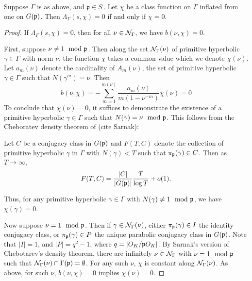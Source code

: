 \documentclass[11pt]{amsart}
\begin{document}
\begin{thm}
Suppose $\Gamma$  is as above, and $\mathfrak{p} \in S$. Let $\chi$ be a class function on $\Gamma$ inflated from one on $G(\mathfrak{p})$. Then $\Lambda_{\Gamma}(s,\chi)=0$ if and only if $\chi=0$. 
\end{thm}
\begin{proof}
If $\Lambda_{\Gamma}(s,\chi)=0$, then for all $\nu \in \mathcal{N}_{\Gamma}$, we have $b(\nu,\chi)=0$. 

First, suppose $\nu\neq 1 \mod {\mathfrak{p}}$. Then along the set $\mathcal{N}_{\Gamma}(\nu)$ of primitive hyperbolic $\gamma \in \Gamma$ with norm $\nu$, the function $\chi$ takes a common value which we denote $\chi(\nu)$. Let $a_{m}(\nu)$ denote the cardinality of $A_{m}(\nu)$, the set of primitive hyperbolic $\gamma \in \Gamma$ such that $N(\gamma^{m})=\nu$. Then 
	\[
		b(\nu,\chi)=-\sum_{m=1}^{m(\nu)}\frac{a_{m}(\nu)}{m(1-\nu^{-m})}\chi(\nu)=0
	\] 
To conclude that $\chi(\nu)=0$, it suffices to demonstrate the existence of a primitive hyperbolic $\gamma \in \Gamma$ such that $N(\gamma)= \nu \mod {\mathfrak{p}}$.  	This follows from the Cheboratev density theorem of (cite Sarnak):

\begin{thm}
	Let $C$ be a conjugacy class in $G(\mathfrak{p})$ and $F(T,C)$ denote the collection of primitive hyperbolic $\gamma$ in $\Gamma$ with $N(\gamma)<T$ such that $\pi_{\mathfrak{p}}(\gamma) \in C$.  Then as $T \to \infty$, 
		\[F(T,C) = \frac{|C|}{|G(\mathfrak{p})|} \frac{T}{\log T} +o(1).\]
\end{thm}

Thus, for any primitive hyperbolic $\gamma \in \Gamma$ with $N(\gamma)\neq 1 \mod {\mathfrak{p}}$, we have $\chi(\gamma)=0$. 

Now suppose $\nu =1 \mod {\mathfrak{p}}$. Then if $\gamma \in \mathcal{N}_{\Gamma}(\nu)$, either $\pi_{\mathfrak{p}}(\gamma) \in I$ the identity conjugacy class, or $\pi_{\mathfrak{p}}(\gamma) \in P$ the unique parabolic conjugacy class in $G(\mathfrak{p})$. Note that $|I|=1$, and $|P|=q^{2}-1$, where $q= |O_{K}/\mathfrak{p} O_{K}|$. By Sarnak's version of Chebotarev's density theorem, there are infinitely $\nu \in \mathcal{N}_{\Gamma}$  with $\nu=1 \mod {\mathfrak{p}}$ such that $\mathcal{N}_{\Gamma}(\nu)\cap \Gamma(\mathfrak{p}) =\emptyset$. For any such $\nu$, $\chi$ is constant along $\mathcal{N}_{\Gamma}(\nu)$. As above, for such $\nu$, $b(\nu,\chi)=0$ implies $\chi(\nu)=0$. 

\end{proof}





{}

\end{document}
